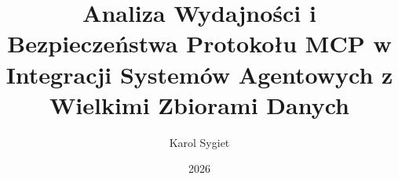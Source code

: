 \documentclass[thesis=mgr,faculty=ee]{EE-dyplom}
\title{Analiza Wydajności i Bezpieczeństwa Protokołu MCP w Integracji Systemów Agentowych z Wielkimi Zbiorami Danych}
\author{Karol Sygiet}
\date{2026}
\begin{document}
    \frontpages

    

    \bibliografia

    
    \acronymslist
    \listoffigures
    \listoftables
    \easyappendices
\end{document}
